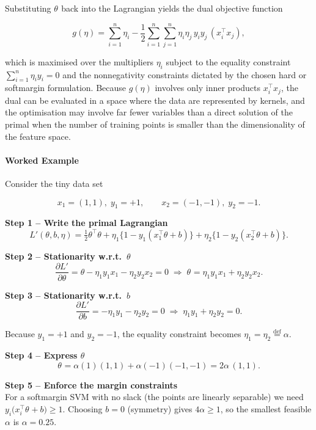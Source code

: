 \documentclass[12pt, a4paper]{article}
\begin{document}
Substituting $\theta^{}$ back into the Lagrangian yields the dual objective function  

\[
g(\eta)=\sum_{i=1}^{n}\eta_i
-\frac12\sum_{i=1}^{n}\sum_{j=1}^{n}
\eta_i\eta_j\,y_i y_j\,(x_i^{\!\top}x_j),
\]

which is maximised over the multipliers $\eta_i$ subject to the equality constraint $\sum_{i=1}^{n}\eta_i y_i =0$ and the nonnegativity constraints dictated by the chosen hard or softmargin formulation.  
Because $g(\eta)$ involves only inner products $x_i^{\!\top}x_j$, the dual can be evaluated in a space where the data are represented by kernels, and the optimisation may involve far fewer variables than a direct solution of the primal when the number of training points is smaller than the dimensionality of the feature space.

\paragraph{Worked Example}
Consider the tiny data set  

\[
x_{1}=(1,1),\; y_{1}=+1,\qquad
x_{2}=(-1,-1),\; y_{2}=-1 .
\]

\textbf{Step 1 -- Write the primal Lagrangian}\\
\[
L'(\theta,b,\eta)=\tfrac12\theta^{\!\top}\theta
+\eta_{1}\bigl\{1-y_{1}(x_{1}^{\!\top}\theta+b)\bigr\}
+\eta_{2}\bigl\{1-y_{2}(x_{2}^{\!\top}\theta+b)\bigr\}.
\]

\textbf{Step 2 -- Stationarity w.r.t.\ $\theta$}\\
\[
\frac{\partial L'}{\partial \theta}= \theta-\eta_{1}y_{1}x_{1}
-\eta_{2}y_{2}x_{2}=0
\;\Longrightarrow\;
\theta^{}= \eta_{1}y_{1}x_{1}+ \eta_{2}y_{2}x_{2}.
\]

\textbf{Step 3 -- Stationarity w.r.t.\ $b$}\\
\[
\frac{\partial L'}{\partial b}= -\eta_{1}y_{1}-\eta_{2}y_{2}=0
\;\Longrightarrow\;
\eta_{1}y_{1}+\eta_{2}y_{2}=0 .
\]

Because $y_{1}=+1$ and $y_{2}=-1$, the equality constraint becomes $\eta_{1}=\eta_{2}\stackrel{\text{def}}{=} \alpha$.

\textbf{Step 4 -- Express $\theta^{}$}\\
\[
\theta^{}= \alpha(1)(1,1)+\alpha(-1)(-1,-1)
          = 2\alpha\,(1,1).
\]

\textbf{Step 5 -- Enforce the margin constraints}\\
For a softmargin SVM with no slack (the points are linearly separable) we need  
$y_{i}\bigl(x_{i}^{\!\top}\theta^{}+b\bigr)\ge 1$.  
Choosing $b=0$ (symmetry) gives $4\alpha\ge 1$, so the smallest feasible $\alpha$ is $\alpha=0.25$.
\end{document}
